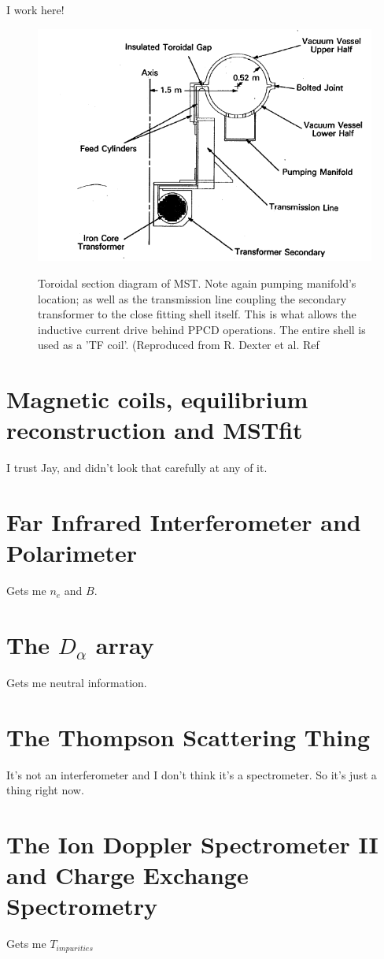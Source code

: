\begin{refsection}
I work here!


\begin{figure}[!htb]
	\centering
	\includegraphics{./2_Experimental_hardware/MST_tor_section.PNG}
	\label{fig:MST_tor_section}
	\caption[Toridal section of MST]{Toroidal section diagram of MST. Note again pumping manifold's location; as well as the transmission line coupling the secondary transformer to the close fitting shell itself. This is what allows the inductive current drive behind PPCD operations. The entire shell is used as a 'TF coil'. (Reproduced from R. Dexter et al. Ref\cite{Dexter100}}
\end{figure}


\section{Magnetic coils, equilibrium reconstruction and MSTfit}
I trust Jay, and didn't look that carefully at any of it\cite{mstfit}.

\section{Far Infrared Interferometer and Polarimeter}
Gets me $n_e$ and $B$.

\section{The $D_{\alpha}$ array}
Gets me neutral information.

\section{The Thompson Scattering Thing}
It's not an interferometer and I don't think it's a spectrometer. So it's just a thing right now.



\section{The Ion Doppler Spectrometer II and Charge Exchange Spectrometry}
Gets me $T_{impurities}$

\printbibliography
\end{refsection}